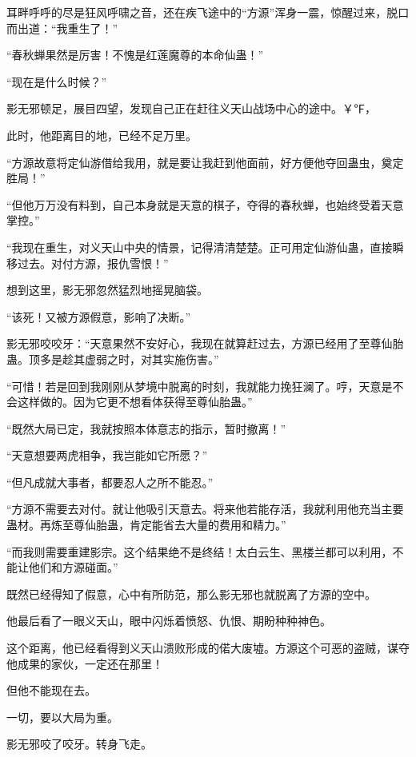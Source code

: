 
\begin{this_body}

耳畔呼呼的尽是狂风呼啸之音，还在疾飞途中的“方源”浑身一震，惊醒过来，脱口而出道：“我重生了！”

“春秋蝉果然是厉害！不愧是红莲魔尊的本命仙蛊！”

“现在是什么时候？”

影无邪顿足，展目四望，发现自己正在赶往义天山战场中心的途中。￥℉，

此时，他距离目的地，已经不足万里。

“方源故意将定仙游借给我用，就是要让我赶到他面前，好方便他夺回蛊虫，奠定胜局！”

“但他万万没有料到，自己本身就是天意的棋子，夺得的春秋蝉，也始终受着天意掌控。”

“我现在重生，对义天山中央的情景，记得清清楚楚。正可用定仙游仙蛊，直接瞬移过去。对付方源，报仇雪恨！”

想到这里，影无邪忽然猛烈地摇晃脑袋。

“该死！又被方源假意，影响了决断。”

影无邪咬咬牙：“天意果然不安好心，我现在就算赶过去，方源已经用了至尊仙胎蛊。顶多是趁其虚弱之时，对其实施伤害。”

“可惜！若是回到我刚刚从梦境中脱离的时刻，我就能力挽狂澜了。哼，天意是不会这样做的。因为它更不想看体获得至尊仙胎蛊。”

“既然大局已定，我就按照本体意志的指示，暂时撤离！”

“天意想要两虎相争，我岂能如它所愿？”

“但凡成就大事者，都要忍人之所不能忍。”

“方源不需要去对付。就让他吸引天意去。将来他若能存活，我就利用他充当主要蛊材。再炼至尊仙胎蛊，肯定能省去大量的费用和精力。”

“而我则需要重建影宗。这个结果绝不是终结！太白云生、黑楼兰都可以利用，不能让他们和方源碰面。”

既然已经得知了假意，心中有所防范，那么影无邪也就脱离了方源的空中。

他最后看了一眼义天山，眼中闪烁着愤怒、仇恨、期盼种种神色。

这个距离，他已经看得到义天山溃败形成的偌大废墟。方源这个可恶的盗贼，谋夺他成果的家伙，一定还在那里！

但他不能现在去。

一切，要以大局为重。

影无邪咬了咬牙。转身飞走。


\end{this_body}
